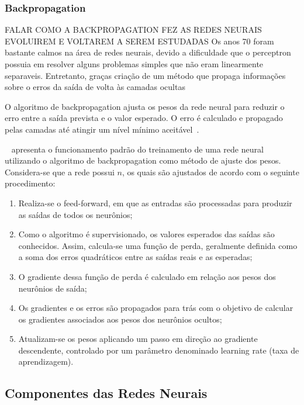         
        \subsubsection{Backpropagation}
            
            FALAR COMO A BACKPROPAGATION FEZ AS REDES NEURAIS EVOLUIREM E VOLTAREM A SEREM ESTUDADAS
            Os anos 70 foram bastante calmos na área de redes neurais, devido a dificuldade que o perceptron 
            possuia em resolver alguns problemas simples que não eram linearmente separaveis. Entretanto, graças 
            criação de um método que propaga informações sobre o erros da saída de volta às camadas ocultas




            O algoritmo de backpropagation ajusta os pesos da rede neural para reduzir o erro entre a saída prevista 
            e o valor esperado. O erro é calculado e propagado pelas camadas até atingir um nível mínimo aceitável~\cite{marangoni2010}.
            
            ~ apresenta o funcionamento padrão do treinamento de uma rede neural utilizando o algoritmo 
            de backpropagation como método de ajuste dos pesos. Considera-se que a rede possui \( n\),  os quais são 
            ajustados de acordo com o seguinte procedimento:
            \begin{enumerate}
                \item Realiza-se o feed-forward, em que as entradas são processadas para produzir as saídas de todos os neurônios;
                \item Como o algoritmo é supervisionado, os valores esperados das saídas são conhecidos. Assim, calcula-se uma função de perda, geralmente definida como a soma dos erros quadráticos entre as saídas reais e as esperadas;
                \item O gradiente dessa função de perda é calculado em relação aos pesos dos neurônios de saída;
                \item Os gradientes e os erros são propagados para trás com o objetivo de calcular os gradientes associados aos pesos dos neurônios ocultos;
                \item Atualizam-se os pesos aplicando um passo em direção ao gradiente descendente, controlado por um parâmetro denominado learning rate (taxa de aprendizagem).
            \end{enumerate}
            
    \subsection{Componentes das Redes Neurais}

